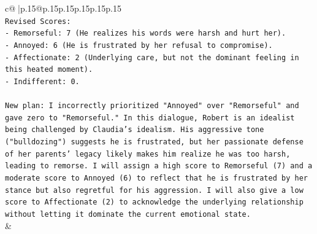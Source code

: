 \documentclass{article}
\begin{document}
{\begin{supertabular}{c@{$\;$}|p{.15\linewidth}@{}p{.15\linewidth}p{.15\linewidth}p{.15\linewidth}p{.15\linewidth}p{.15\linewidth}}
{{{\\ 
\texttt{Revised Scores:} \\
\texttt{{-} Remorseful: 7 (He realizes his words were harsh and hurt her).} \\
\texttt{{-} Annoyed: 6 (He is frustrated by her refusal to compromise).} \\
\texttt{{-} Affectionate: 2 (Underlying care, but not the dominant feeling in this heated moment).} \\
\texttt{{-} Indifferent: 0.} \\
\\ 
\texttt{New plan: I incorrectly prioritized "Annoyed" over "Remorseful" and gave zero to "Remorseful." In this dialogue, Robert is an idealist being challenged by Claudia's idealism. His aggressive tone ("bulldozing") suggests he is frustrated, but her passionate defense of her parents' legacy likely makes him realize he was too harsh, leading to remorse. I will assign a high score to Remorseful (7) and a moderate score to Annoyed (6) to reflect that he is frustrated by her stance but also regretful for his aggression. I will also give a low score to Affectionate (2) to acknowledge the underlying relationship without letting it dominate the current emotional state.} \\
            }
        }
    }
    & \\ \\

\end{supertabular}
}
\end{document}
